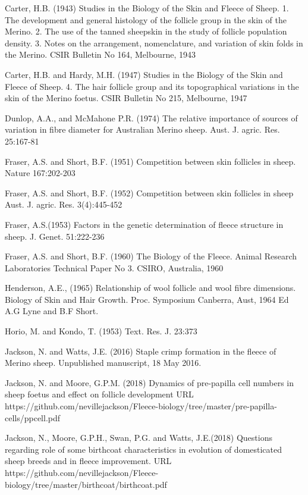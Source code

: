 \documentclass[titlepage]{article}  %
\begin{document}
\begin{thebibliography}{99}

Carter, H.B. (1943) Studies in the Biology of the Skin and Fleece of Sheep. 1. The development and general histology of the follicle group in the skin of the Merino. 2. The use of the tanned sheepskin in the study of follicle population density. 3. Notes on the arrangement, nomenclature, and variation of skin folds in the Merino. CSIR Bulletin No 164, Melbourne, 1943

Carter, H.B. and Hardy, M.H. (1947) Studies in the Biology of the Skin and Fleece of Sheep. 4. The hair follicle group and its topographical variations in the skin of the Merino foetus. CSIR Bulletin No 215, Melbourne, 1947

Dunlop, A.A., and McMahone P.R. (1974)  The relative importance of sources of variation in fibre diameter for Australian Merino sheep. Aust. J. agric. Res. 25:167-81

Fraser, A.S. and Short, B.F. (1951) Competition between skin follicles in sheep. Nature 167:202-203

Fraser, A.S. and Short, B.F. (1952) Competition between skin follicles in sheep Aust. J. agric. Res. 3(4):445-452

Fraser, A.S.(1953) Factors in the genetic determination of fleece structure in sheep. J. Genet. 51:222-236

Fraser, A.S. and Short, B.F. (1960) The Biology of the Fleece. Animal Research Laboratories Technical Paper No 3. CSIRO, Australia, 1960

Henderson, A.E., (1965) Relationship of wool follicle and wool fibre dimensions. Biology of Skin and Hair Growth. Proc. Symposium Canberra, Aust, 1964 Ed A.G Lyne and B.F Short.

Horio, M. and Kondo, T. (1953) Text. Res. J. 23:373

Jackson, N. and Watts, J.E. (2016) Staple crimp formation in the fleece of Merino sheep. Unpublished manuscript, 18 May 2016.


Jackson, N. and Moore, G.P.M. (2018)
Dynamics of pre-papilla cell numbers in sheep foetus and effect on follicle development URL https://github.com/nevillejackson/Fleece-biology/tree/master/pre-papilla-cells/ppcell.pdf

Jackson, N., Moore, G.P.H., Swan, P.G. and Watts, J.E.(2018) Questions regarding role of some birthcoat characteristics in evolution of domesticated sheep breeds and in fleece improvement. URL https://github.com/nevillejackson/Fleece-biology/tree/master/birthcoat/birthcoat.pdf


\end{thebibliography}
\end{document}
